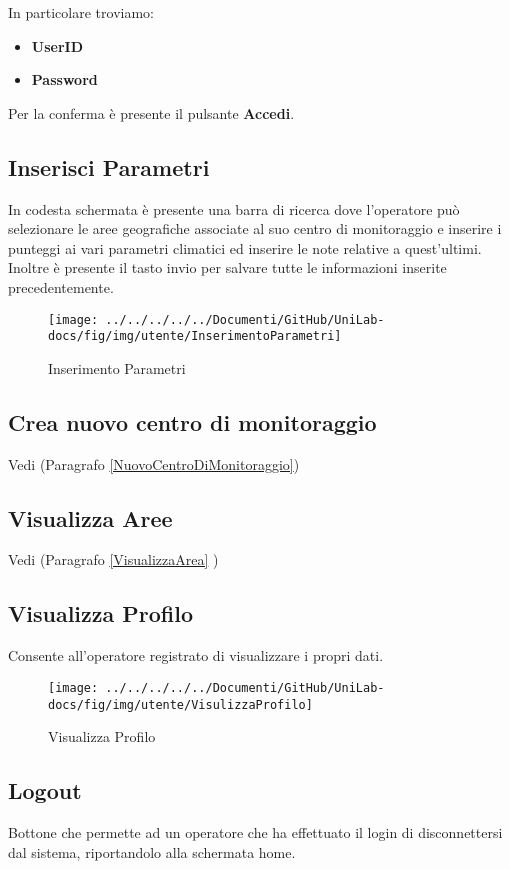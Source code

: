 In particolare troviamo:
\begin{itemize}
	\item \textbf{UserID} 
	\item \textbf{Password}
\end{itemize} 

Per la conferma è presente il pulsante \textbf{Accedi}.

\pagebreak
\subsection{Inserisci Parametri}
In codesta schermata è presente una barra di ricerca dove l'operatore può selezionare le aree geografiche associate al suo centro di monitoraggio e inserire i punteggi ai vari parametri climatici ed inserire le note relative a quest'ultimi.
Inoltre è presente il tasto invio per salvare tutte le informazioni inserite precedentemente.

\begin{figure}[h]
	\centering
	\texttt{[image: ../../../../../Documenti/GitHub/UniLab-docs/fig/img/utente/InserimentoParametri]}
	\caption{Inserimento Parametri}
	\label{fig:inserimentoparametri}
\end{figure}


\subsection{Crea nuovo centro di monitoraggio}
Vedi (Paragrafo \ref{NuovoCentroDiMonitoraggio})
\subsection{Visualizza Aree}
Vedi (Paragrafo \ref{VisualizzaArea} )

\pagebreak
\subsection{Visualizza Profilo} \label{Profilo}
Consente all'operatore registrato di visualizzare i propri dati.

\begin{figure}[h]
	\centering
	\texttt{[image: ../../../../../Documenti/GitHub/UniLab-docs/fig/img/utente/VisulizzaProfilo]}
	\caption{Visualizza Profilo}
	\label{fig:visulizzaprofilo}
\end{figure}

\subsection{Logout}
Bottone che permette ad un operatore che ha effettuato il login di disconnettersi dal sistema, riportandolo alla schermata home. 


